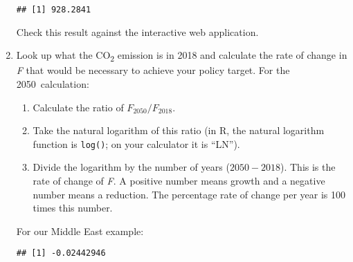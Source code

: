 \documentclass[
]{article}
\newenvironment{Shaded}{\begin{snugshade}}{\end{snugshade}}
\newcommand{\DecValTok}[1]{\textcolor[rgb]{0.00,0.00,0.81}{#1}}
\newcommand{\KeywordTok}[1]{\textcolor[rgb]{0.13,0.29,0.53}{\textbf{#1}}}
\newcommand{\NormalTok}[1]{#1}
\newcommand{\OperatorTok}[1]{\textcolor[rgb]{0.81,0.36,0.00}{\textbf{#1}}}
\newcommand{\StringTok}[1]{\textcolor[rgb]{0.31,0.60,0.02}{#1}}
\providecommand{\tightlist}{%
  \setlength{\itemsep}{0pt}\setlength{\parskip}{0pt}}
\begin{document}
\begin{enumerate}
\begin{verbatim}
## [1] 928.2841
\end{verbatim}

  Check this result against the interactive web application.
\item
  Look up what the CO\textsubscript{2} emission is in 2018 and calculate
  the rate of change in \emph{F} that would be necessary to achieve your
  policy target. For the 2050~calculation:

  \begin{enumerate}
  \def\labelenumii{\alph{enumii}.}
  \tightlist
  \item
    Calculate the ratio of \(F_{2050}/F_{2018}\).
  \item
    Take the natural logarithm of this ratio (in R, the natural
    logarithm function is \texttt{log()}; on your calculator it is
    ``LN'').
  \item
    Divide the logarithm by the number of years (\(2050 - 2018\)). This
    is the rate of change of \emph{F}. A positive number means growth
    and a negative number means a reduction. The percentage rate of
    change per year is 100 times this number.
  \end{enumerate}

  For our Middle East example:

\begin{Shaded}
\end{Shaded}

\begin{verbatim}
## [1] -0.02442946
\end{verbatim}


\end{enumerate}
\end{document}
